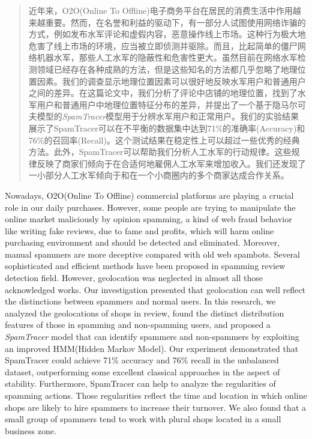 
\begin{abstract}

近年来，O2O(Online To Offline)电子商务平台在居民的消费生活中作用越来越重要。然而，在名誉和利益的驱动下，有一部分人试图使用网络诈骗的方式，例如发布水军评论和虚假内容，恶意操作线上市场。这种行为极大地危害了线上市场的环境，应当被立即侦测并驱除。而且，比起简单的僵尸网络机器水军，那些人工水军的隐蔽性和危害性更大。虽然目前在网络水军检测领域已经存在各种成熟的方法，但是这些知名的方法都几乎忽略了地理位置因素。我们的调查显示地理位置因素可以很好地反映水军用户和普通用户之间的差异。在这篇论文中，我们分析了评论中店铺的地理位置，找到了水军用户和普通用户中地理位置特征分布的差异，并提出了一个基于隐马尔可夫模型的\emph{SpamTracer}模型用于分辨水军用户和正常用户。我们的实验结果展示了SpamTracer可以在不平衡的数据集中达到71\%的准确率(Accuracy)和76\%的召回率(Recall)。这个测试结果在稳定性上可以超过一些优秀的经典方法。此外，SpamTracer可以帮助我们分析人工水军的行动规律。这些规律反映了商家们倾向于在合适何地雇佣人工水军来增加收入。我们还发现了一小部分人工水军倾向于和在一个小商圈内的多个商家达成合作关系。

\end{abstract}

\begin{englishabstract}

Nowadays, O2O(Online To Offline) commercial platforms are playing a crucial role in our daily purchases. However, some people are trying to manipulate the online market maliciously by opinion spamming, a kind of web fraud behavior like writing fake reviews, due to fame and profits, which will harm online purchasing environment and should be detected and eliminated. Moreover, manual spammers are more deceptive compared with old web spambots. Several sophisticated and efficient methods have been proposed in spamming review detection field. However, geolocation was neglected in almost all those acknowledged works. Our investigation presented that geolocation can well reflect the distinctions between spammers and normal users. In this research, we analyzed the geolocations of shops in review, found the distinct distribution features of those in spamming and non-spamming users, and proposed a \emph{SpamTracer} model that can identify spammers and non-spammers by exploiting an improved HMM(Hidden Markov Model). Our experiment demonstrated that SpamTracer could achieve 71\% accuracy and 76\% recall in the unbalanced dataset, outperforming some excellent classical approaches in the aspect of stability. Furthermore, SpamTracer can help to analyze the regularities of spamming actions. Those regularities reflect the time and location in which online shops are likely to hire spammers to increase their turnover. We also found that a small group of spammers tend to work with plural shops located in a small business zone.

\end{englishabstract}

